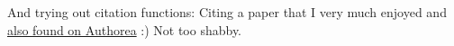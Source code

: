 And trying out citation functions: \cite{2014PLSCB..10E3542G} Citing a paper that I very much enjoyed and \href{https://www.authorea.com/users/3/articles/3410/_show_article}{also found on Authorea} :) Not too shabby.


    
    
    
    
    